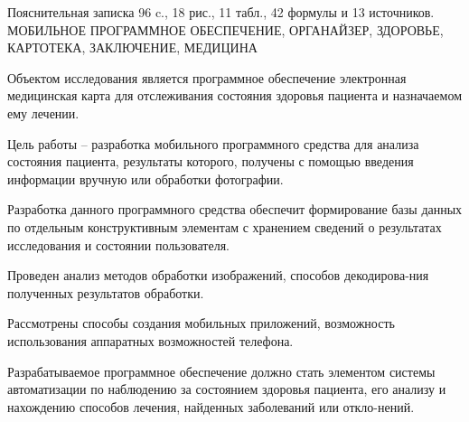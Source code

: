 \thispagestyle{empty}

\begin{center}
Пояснительная записка 96 c., 18 рис., 11 табл., 42 формулы и 13 источников.\\
\MakeUppercase{мобильное программное обеспечение, органайзер, здоровье, картотека, заключение, медицина}
\end{center}

Объектом исследования является программное обеспечение электронная медицинская карта для отслеживания состояния здоровья пациента и назначаемом ему лечении.

Цель работы -- разработка мобильного программного средства для анализа состояния пациента, результаты которого, получены с помощью введения информации вручную или обработки фотографии.

Разработка данного программного средства обеспечит формирование базы данных по отдельным конструктивным элементам с хранением сведений о результатах исследования и состоянии пользователя. 

Проведен анализ методов обработки изображений, способов декодирова-ния полученных результатов обработки.

Рассмотрены способы создания мобильных приложений, возможность использования аппаратных возможностей телефона.

Разрабатываемое программное обеспечение должно стать элементом системы автоматизации по наблюдению за состоянием здоровья пациента, его анализу и нахождению способов лечения, найденных заболеваний или откло-нений.

\clearpage
